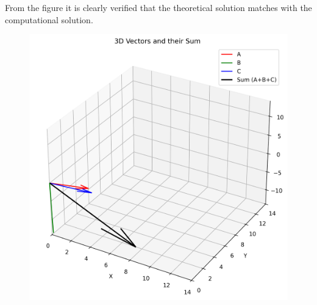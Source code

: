 \documentclass[journal]{IEEEtran}
\begin{document}
From the figure it is clearly verified that the theoretical solution matches with the computational solution.\\
\begin{figure}[h!]
    \centering
    \includegraphics[height=0.5\textheight, keepaspectratio]{figs/Figure_1.png}
    \label{figure_1}
\end{figure}
 
\end{document}
